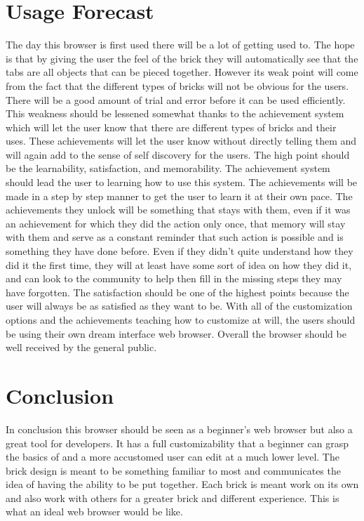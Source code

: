 \documentclass[11pt]{article}
\begin{document}
\section{Usage Forecast}
The day this browser is first used there will be a lot of getting used to. The hope is that by giving the user the feel of the brick they will automatically see that the tabs are all objects that can be pieced together. However its weak point will come from the fact that the different types of bricks will not be obvious for the users. There will be a good amount of trial and error before it can be used efficiently. This weakness should be lessened somewhat thanks to the achievement system which will let the user know that there are different types of bricks and their uses. These achievements will let the user know without directly telling them and will again add to the sense of self discovery for the users. The high point should be the learnability, satisfaction, and memorability. The achievement system should lead the user to learning how to use this system. The achievements will be made in a step by step manner to get the user to learn it at their own pace. The achievements they unlock will be something that stays with them, even if it was an achievement for which they did the action only once, that memory will stay with them and serve as a constant reminder that such action is possible and is something they have done before. Even if they didn’t quite understand how they did it the first time, they will at least have some sort of idea on how they did it, and can look to the community to help then fill in the missing steps they may have forgotten. The satisfaction should be one of the highest points because the user will always be as satisfied as they want to be. With all of the customization options and the achievements teaching how to customize at will, the users should be using their own dream interface web browser. Overall the browser should be well received by the general public.

\section{Conclusion}
In conclusion this browser should be seen as a beginner’s web browser but also a great tool for developers. It has a full customizability that a beginner can grasp the basics of and a more accustomed user can edit at a much lower level. The brick design is meant to be something familiar to most and communicates the idea of having the ability to be put together. Each brick is meant work on its own and also work with others for a greater brick and different experience. This is what an ideal web browser would be like.
\end{document}
